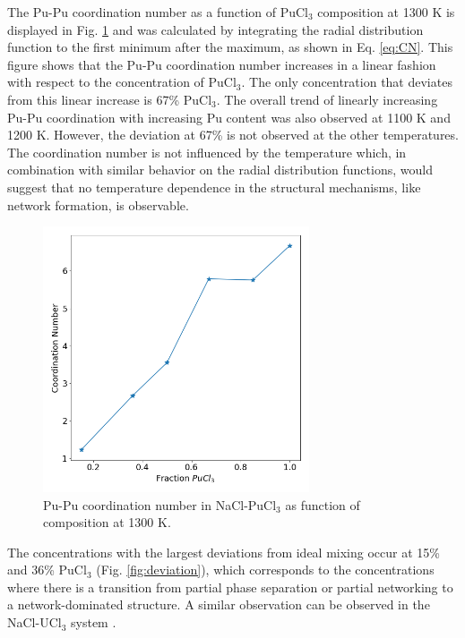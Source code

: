 \documentclass[review]{elsarticle}
\begin{document}
The Pu-Pu coordination number as a function of PuCl$_3$ composition at 1300 K is displayed in Fig. \ref{fig:coordination_number} and was calculated by integrating the radial distribution function to the first minimum after the maximum, as shown in Eq. \ref{eq:CN}. This figure shows that the Pu-Pu coordination number increases in a linear fashion with respect to the concentration of PuCl$_3$. The only concentration that deviates from this linear increase is 67\% PuCl$_3$. The overall trend of linearly increasing Pu-Pu coordination with increasing Pu content was also observed at 1100 K and 1200 K. However, the deviation at 67\% is not observed at the other temperatures. The coordination number is not influenced by the temperature which, in combination with similar behavior on the radial distribution functions, would suggest that no temperature dependence in the structural mechanisms, like network formation, is observable.

\begin{figure}[h!]
 \centering
 \includegraphics[width=0.7\textwidth]{coordination_number.png} 
 \caption{Pu-Pu coordination number in NaCl-PuCl$_3$ as function of composition at 1300 K.}
 \label{fig:coordination_number}
\end{figure}

The concentrations with the largest deviations from ideal mixing occur at 15\% and 36\% PuCl$_3$ (Fig. \ref{fig:deviation}), which corresponds to the concentrations where there is a transition from partial phase separation or partial networking to a network-dominated structure. A similar observation can be observed in the NaCl-UCl$_3$ system \cite{ANDERSSON2022153836}.
\
\end{document}
